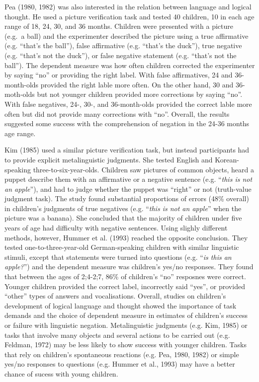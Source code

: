 \documentclass[man,floatsintext]{apa6}
\begin{document}
Pea (1980, 1982) was also interested in the relation between language and logical thought. He used a picture verification task and tested 40 children, 10 in each age range of 18, 24, 30, and 36 months. Children were presented with a picture (e.g.~a ball) and the experimenter described the picture using a true affirmative (e.g. \enquote{that's the ball}), false affirmative (e.g. \enquote{that's the duck}), true negative (e.g. \enquote{that's not the duck}), or false negative statement (e.g. \enquote{that's not the ball}). The dependent measure was how often children corrected the experimenter by saying \enquote{no} or providing the right label. With false affirmatives, 24 and 36-month-olds provided the right lable more often. On the other hand, 30 and 36-moth-olds but not younger children provided more corrections by saying \enquote{no}. With false negatives, 24-, 30-, and 36-month-olds provided the correct lable more often but did not provide many corrections with \enquote{no}. Overall, the results suggested some success with the comprehension of negation in the 24-36 months age range.

Kim (1985) used a similar picture verification task, but instead participants had to provide explicit metalinguistic judgments. She tested English and Korean-speaking three-to-six-year-olds. Children saw pictures of common objects, heard a puppet describe them with an affirmative or a negative sentence (e.g. \enquote{\emph{this is not an apple}}), and had to judge whether the puppet was \enquote{right} or not (truth-value judgment task). The study found substantial proportions of errors (48\% overall) in children's judgments of true negatives (e.g. \enquote{\emph{this is not an apple}} when the picture was a banana). She concluded that the majority of children under five years of age had difficulty with negative sentences. Using slighly different methods, however, Hummer et al. (1993) reached the opposite conclusion. They tested one-to-three-year-old German-speaking children with similar linguistic stimuli, except that statements were turned into questions (e.g. \enquote{\emph{is this an apple?}}) and the dependent measure was children's yes/no responses. They found that between the ages of 2;4-2;7, 86\% of children's \enquote{no} resposnes were correct. Younger children provided the correct label, incorrectly said \enquote{yes}, or provided \enquote{other} types of answers and vocalisations. Overall, studies on children's development of logical language and thought showed the importance of task demands and the choice of dependent measure in estimates of children's success or failure with linguistic negation. Metalinguistic judgments (e.g. Kim, 1985) or tasks that involve many objects and several actions to be carried out (e.g. Feldman, 1972) may be less likely to show success with younger children. Tasks that rely on children's spontaneous reactions (e.g. Pea, 1980, 1982) or simple yes/no responses to questions (e.g. Hummer et al., 1993) may have a better chance of sucess with young children.
\end{document}
